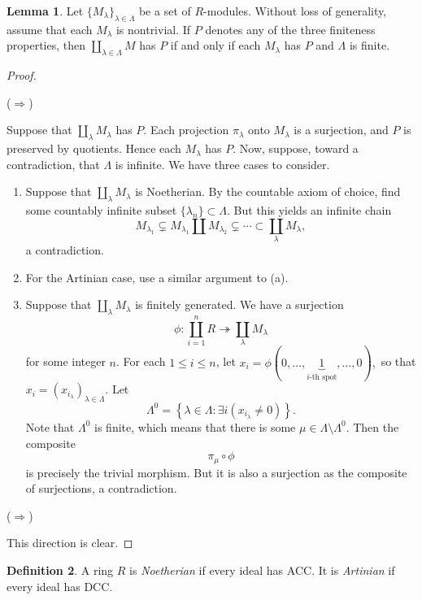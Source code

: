 \documentclass[10pt,letterpaper,cm]{nupset}
\theoremstyle{definition}
\newtheorem{definition}{Definition}[subsection]
\theoremstyle{theorem}
\newtheorem{lemma}[definition]{Lemma}
\theoremstyle{remark}
\newcommand{\1}{\mathbf{1}}
\newcommand{\0}{\vec 0}
\newcommand{\dcc}{\textsf{DCC}\xspace}
\newcommand{\acc}{\textsf{ACC}\xspace}
\begin{document}
\begin{lemma}
Let $\{M_{\lambda}\}_{\lambda\in \Lambda}$ be a set of $R$-modules. Without loss of generality, assume that each $M_{\lambda}$ is nontrivial. If $P$ denotes any of the three finiteness properties, then $\coprod_{\lambda \in \Lambda} M$ has $P$  if and only if each $M_{\lambda}$ has $P$ and $\Lambda$ is finite.
\end{lemma}
\begin{proof} $ $
\smallskip

($\Longrightarrow$)

 Suppose that $\coprod_{\lambda} M_{\lambda}$ has $P$. Each projection $\pi_{\lambda}$ onto $M_{\lambda}$ is a surjection, and $P$ is preserved by quotients. Hence each $M_{\lambda}$ has $P$. Now, suppose, toward a contradiction, that $\Lambda$ is infinite. We have three cases to consider.
\begin{enumerate}[label=(\alph*)]
\item Suppose that $\coprod_{\lambda} M_{\lambda}$ is Noetherian. By the countable axiom of choice, find some countably infinite subset $\{\lambda_n\}\subset \Lambda.$ But this yields an infinite chain $$M_{\lambda_1} \subsetneq M_{\lambda_1} \coprod M_{\lambda_2} \subsetneq \cdots \subset \coprod_{\lambda} M_{\lambda},$$ a contradiction.
\item For the Artinian case, use a similar argument to (a).
\item Suppose that $\coprod_{\lambda} M_{\lambda}$ is finitely generated. We have a surjection $$\phi: \coprod_{i=1}^n R \twoheadrightarrow \coprod_{\lambda} M_{\lambda}$$ for some integer $n$. For each $1\leq i\leq n$, let $x_i = \phi(0, \ldots, \underbrace{1}_{i\text{-th spot}}, \ldots, 0),$ so that $x_i = (x_{i_{\lambda}})_{\lambda \in \Lambda}$. Let $$\Lambda^0 = \left\{\lambda \in \Lambda : \exists i\left(x_{i_\lambda}\ne 0\right)\right\} .$$ Note that $\Lambda^0$ is finite, which means that there is some $\mu \in \Lambda \setminus \Lambda^0$.  Then the composite $$\pi_{\mu} \circ \phi$$ is precisely the trivial morphism. But it is also a surjection as the composite of surjections, a contradiction. 
\end{enumerate}

($\Longrightarrow$)

This direction is clear.
\end{proof}

\begin{definition}
A ring $R$ is \textit{Noetherian} if every ideal has  \acc. It is \textit{Artinian} if every ideal has \dcc.
\end{definition}
\end{document}
